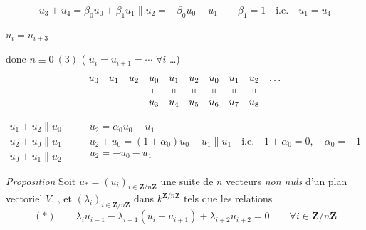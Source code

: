 \documentclass[11pt,a4paper]{article}
\begin{document}
\[
u_3 + u_4 = \beta_0 u_0 + \beta_1 u_1 \parallel u_2 = -\beta_0 u_0 - u_1
\qquad \beta_1 = 1 \quad \text{i.e.} \quad u_1 = u_4
\]

 $u_i = u_{i+3}$ \qquad {}

donc $n \equiv 0 \ (3)$ \quad (\ill{} $u_i = u_{i+1} = \cdots$ $\forall i$
\ldots)
\[
\begin{array}{cccccccccc}
u_0 & u_1 & u_2 & u_0 & u_1 & u_2 & u_0 & u_1 & u_2 & \ldots \\
 & & & \shortparallel & \shortparallel & \shortparallel & \shortparallel & \shortparallel & \shortparallel & \\
 & & & u_3 & u_4 & u_5 & u_6 & u_7 & u_8 &
\end{array}
\]


\[
\begin{array}{l}
u_1 + u_2 \parallel u_0 \\
u_2 + u_0 \parallel u_1 \\
u_0 + u_1 \parallel u_2
\end{array}
\qquad
\begin{array}{l}
u_2 = \alpha_0 u_0 - u_1 \\
u_2 + u_0 = (1 + \alpha_0) u_0 - u_1 \parallel u_1
 \quad \text{i.e.} \quad 1 + \alpha_0 = 0, \quad \alpha_0 = -1 \\
u_2 = -u_0 - u_1
\end{array}
\]

\emph{Proposition} Soit $u_* = (u_i)_{i \in \mathbf{Z}/n\mathbf{Z}}$ une
suite de $n$ vecteurs \add{\ill{}} \emph{non nuls} d'un plan vectoriel $V$,
\struck{\ill{}} \struck{(\ill{})}, et 
 $(\lambda_i)_{i \in \mathbf{Z}/n\mathbf{Z}}$
dans $k^{\mathbf{Z}/n\mathbf{Z}}$ tels que  les
relations
\[
(*) \qquad \lambda_i u_{i-1} - \lambda_{i+1} (u_i + u_{i+1}) + \lambda_{i+2} u_{i+2} = 0
\qquad \forall i \in \mathbf{Z}/n\mathbf{Z}
\]
\end{document}
